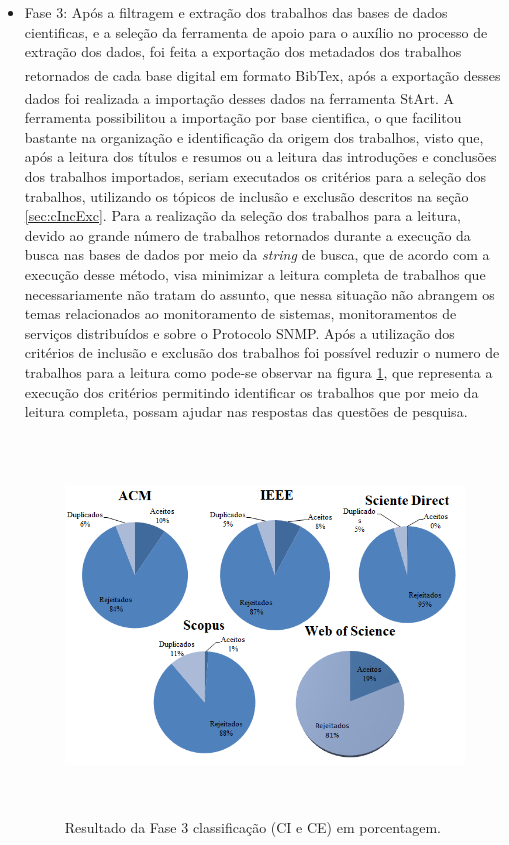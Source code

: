 \begin{itemize}
\item Fase 3: Após a filtragem e extração dos trabalhos das bases de dados cientificas, e a seleção da ferramenta de apoio para o auxílio no processo de extração dos dados, foi feita a exportação dos metadados dos trabalhos retornados de cada base digital em formato BibTex\textsuperscript{\textregistered}\cite{chomsky1969linguistica}, após a exportação desses dados foi realizada a importação desses dados na ferramenta \acrshort{StArt}\textsuperscript{\textregistered}. A ferramenta possibilitou a importação por base cientifica, o que facilitou bastante na organização e identificação da origem dos trabalhos, visto que, após a leitura dos títulos e resumos ou a leitura das introduções e conclusões dos trabalhos importados, seriam executados os critérios para a seleção dos trabalhos, utilizando os tópicos de inclusão e exclusão descritos na seção \ref{sec:cIncExc}. Para a realização da seleção dos trabalhos para a leitura, devido ao grande número de trabalhos retornados durante a execução da busca nas bases de dados por meio da \textit{string} de busca, que de acordo com \cite{petersen2008systematic} a execução desse método, visa minimizar a leitura completa de trabalhos que necessariamente não tratam do assunto, que nessa situação não abrangem os temas relacionados ao monitoramento de sistemas, monitoramentos de serviços distribuídos e sobre o Protocolo \acrshort{SNMP}. Após a utilização dos critérios de inclusão e exclusão dos trabalhos foi possível reduzir o numero de trabalhos para a leitura como pode-se observar na figura \ref{fig:fase3Criterios}, que representa a execução dos critérios permitindo identificar os trabalhos que por meio da leitura completa, possam ajudar nas respostas das questões de pesquisa.  


\begin{figure}[!ht]
\centering
\includegraphics[width = 13cm, height=10cm]{img/Classificacao_FASE_3_CI_e_CE.png}
\caption{Resultado da Fase 3 classificação (CI e CE) em porcentagem.}
\label{fig:fase3Criterios}
\end{figure}


\end{itemize}
